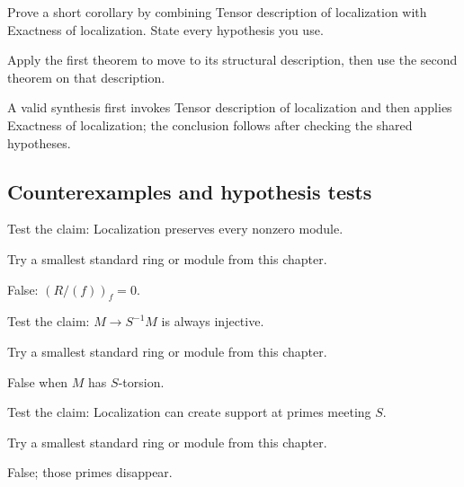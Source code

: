 \begin{exercise}\label{exr:v07-expand-09}
Prove a short corollary by combining Tensor description of localization with Exactness of localization. State every hypothesis you use.
\end{exercise}
\begin{hint}
Apply the first theorem to move to its structural description, then use the second theorem on that description.
\end{hint}
\begin{solution}
A valid synthesis first invokes Tensor description of localization and then applies Exactness of localization; the conclusion follows after checking the shared hypotheses.
\end{solution}

\subsection*{Counterexamples and hypothesis tests}

\begin{exercise}\label{exr:v07-expand-10}
Test the claim: Localization preserves every nonzero module.
\end{exercise}
\begin{hint}
Try a smallest standard ring or module from this chapter.
\end{hint}
\begin{solution}
False: $(R/(f))_f=0$.
\end{solution}

\begin{exercise}\label{exr:v07-expand-11}
Test the claim: $M\to S^{-1}M$ is always injective.
\end{exercise}
\begin{hint}
Try a smallest standard ring or module from this chapter.
\end{hint}
\begin{solution}
False when $M$ has $S$-torsion.
\end{solution}

\begin{exercise}\label{exr:v07-expand-12}
Test the claim: Localization can create support at primes meeting $S$.
\end{exercise}
\begin{hint}
Try a smallest standard ring or module from this chapter.
\end{hint}
\begin{solution}
False; those primes disappear.
\end{solution}

